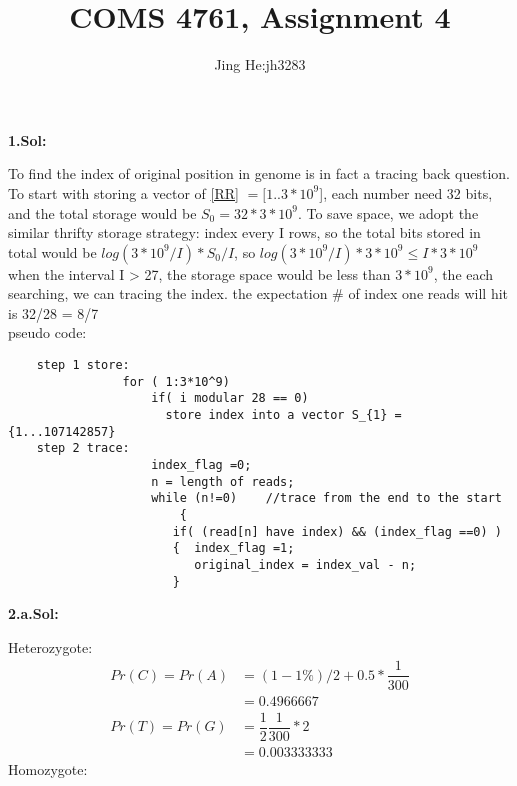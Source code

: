 \documentclass[a4paper,11pt]{article}\usepackage{graphicx, color}
\title{COMS 4761, Assignment 4}
\author{Jing He:jh3283}
\begin{document}
\maketitle

\textbf{1.Sol:}

To find the index of original position in genome is in fact a tracing back question. To start with storing a vector of \ref{RR} $=[1..3*10^{9}$], each number need 32 bits, and the total storage would be $S_{0} = 32 * 3*10^{9}$. To save space, we adopt the similar thrifty storage strategy: index every I rows, so the total bits stored in total would be $log(3*10^{9}/I) * S_{0} / I$, so $log(3*10^{9}/I) * 3*10^{9} \leq I*3*10^{9}$ \\

when the interval I > 27, the storage space would be less than $3 * 10^{9}$, the each searching, we can tracing the index. the expectation $\#$ of index one reads will hit is 32/28 = 8/7\\


pseudo code: 
\begin{verbatim}
	step 1 store:
				for ( 1:3*10^9) 
					if( i modular 28 == 0) 
					  store index into a vector S_{1} = {1...107142857}
	step 2 trace: 
					index_flag =0;
					n = length of reads;
					while (n!=0)    //trace from the end to the start
						{   
					   if( (read[n] have index) && (index_flag ==0) )
					   {  index_flag =1;
					      original_index = index_val - n; 
					   }

\end{verbatim}
\textbf{2.a.Sol:}

Heterozygote:
\begin{align}
 Pr(C) = Pr(A) &= (1-1\%)/2 + 0.5*\dfrac{1}{300} \\
                &= 0.4966667 \\
 				Pr(T) = Pr(G) &= \dfrac{1}{2}\dfrac{1}{300} * 2 \\
                 &= 0.003333333 
 \end{align}
Homozygote: 
\end{document}
